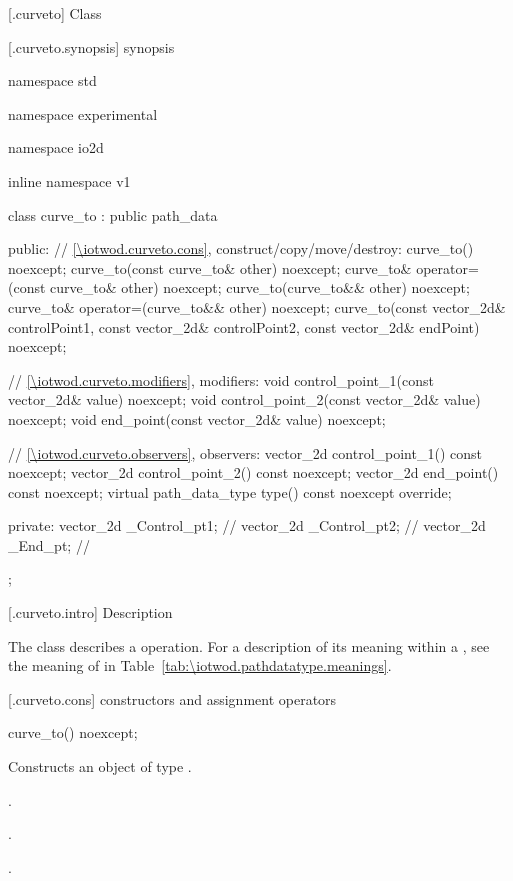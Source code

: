  [\iotwod.curveto] {Class }

 [\iotwod.curveto.synopsis] { synopsis}

\begin{codeblock}
namespace std { namespace experimental { namespace io2d { inline namespace v1 {
  class curve_to : public path_data {
  public:
    // \ref{\iotwod.curveto.cons}, construct/copy/move/destroy:
    curve_to() noexcept;
    curve_to(const curve_to& other) noexcept;
    curve_to& operator=(const curve_to& other) noexcept;
    curve_to(curve_to&& other) noexcept;
    curve_to& operator=(curve_to&& other) noexcept;
    curve_to(const vector_2d& controlPoint1, const vector_2d& controlPoint2,
      const vector_2d& endPoint) noexcept;

    // \ref{\iotwod.curveto.modifiers}, modifiers:
    void control_point_1(const vector_2d& value) noexcept;
    void control_point_2(const vector_2d& value) noexcept;
    void end_point(const vector_2d& value) noexcept;


    // \ref{\iotwod.curveto.observers}, observers:
    vector_2d control_point_1() const noexcept;
    vector_2d control_point_2() const noexcept;
    vector_2d end_point() const noexcept;
    virtual path_data_type type() const noexcept override;
    
  private:
    vector_2d _Control_pt1; // \expos
    vector_2d _Control_pt2; // \expos
    vector_2d _End_pt;      // \expos
  };
} } } }
\end{codeblock}

 [\iotwod.curveto.intro] { Description}

\pnum
{}
The class  describes a  operation. For a description of its meaning within a , see the meaning of  in Table~\ref{tab:\iotwod.pathdatatype.meanings}.

 [\iotwod.curveto.cons] { constructors and assignment operators}

\begin{itemdecl}
    curve_to() noexcept;
\end{itemdecl}
\begin{itemdescr}
	\pnum
	\effects
	Constructs an object of type .
	
	\pnum
	\postconditions
	.

	.

	.

\end{itemdescr}

